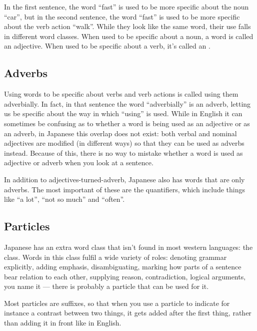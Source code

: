 \documentclass[11pt, b5paper, twoside, openright, onecolumn]{book}
\begin{document}
In the first sentence‚ the word “fast” is used to be more specific about the noun “car”‚ but in the second sentence‚ the word “fast” is used to be more specific about the verb action “walk”. While they look like the same word‚ their use falls in different word classes. When used to be specific about a noun‚ a word is called an adjective. When used to be specific about a verb‚ it’s called an .

\subsection{Adverbs}

Using words to be specific about verbs and verb actions is called using them adverbially. In fact‚ in that sentence the word “adverbially” is an adverb‚ letting us be specific about the way in which “using” is used. While in English it can sometimes be confusing as to whether a word is being used as an adjective or as an adverb‚ in Japanese this overlap does not exist: both verbal and nominal adjectives are modified (in different ways) so that they can be used as adverbs instead. Because of this‚ there is no way to mistake whether a word is used as adjective or adverb when you look at a sentence.

In addition to adjectives-turned-adverb‚ Japanese also has words that are only adverbs. The most important of these are the quantifiers‚ which include things like “a lot”‚ “not so much” and “often”.

\subsection{Particles}

Japanese has an extra word class that isn’t found in most western languages: the  class. Words in this class fulfil a wide variety of roles: denoting grammar explicitly‚ adding emphasis‚ disambiguating‚ marking how parts of a sentence bear relation to each other‚ supplying reason‚ contradiction‚ logical arguments‚ you name it — there is probably a particle that can be used for it.

Most particles are suffixes‚ so that when you use a particle to indicate for instance a contrast between two things‚ it gets added after the first thing‚ rather than adding it in front like in English.
\end{document}
